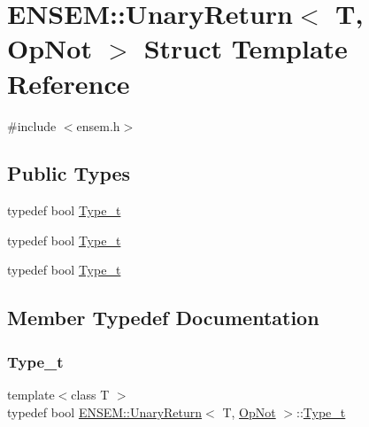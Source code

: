 \hypertarget{structENSEM_1_1UnaryReturn_3_01T_00_01OpNot_01_4}{}\section{E\+N\+S\+EM\+:\+:Unary\+Return$<$ T, Op\+Not $>$ Struct Template Reference}
\label{structENSEM_1_1UnaryReturn_3_01T_00_01OpNot_01_4}


{\ttfamily \#include $<$ensem.\+h$>$}

\subsection*{Public Types}
\begin{DoxyCompactItemize}
\item 
typedef bool \mbox{\hyperlink{structENSEM_1_1UnaryReturn_3_01T_00_01OpNot_01_4_ac8f0fccccf6b1d70cd924f95199cf9b4}{Type\+\_\+t}}
\item 
typedef bool \mbox{\hyperlink{structENSEM_1_1UnaryReturn_3_01T_00_01OpNot_01_4_ac8f0fccccf6b1d70cd924f95199cf9b4}{Type\+\_\+t}}
\item 
typedef bool \mbox{\hyperlink{structENSEM_1_1UnaryReturn_3_01T_00_01OpNot_01_4_ac8f0fccccf6b1d70cd924f95199cf9b4}{Type\+\_\+t}}
\end{DoxyCompactItemize}


\subsection{Member Typedef Documentation}
\mbox{\label{structENSEM_1_1UnaryReturn_3_01T_00_01OpNot_01_4_ac8f0fccccf6b1d70cd924f95199cf9b4}} 
\subsubsection{\texorpdfstring{Type\_t}{Type\_t}\hspace{0.1cm}{\footnotesize\ttfamily [1/3]}}
{\footnotesize\ttfamily template$<$class T $>$ \\
typedef bool \mbox{\hyperlink{structENSEM_1_1UnaryReturn}{E\+N\+S\+E\+M\+::\+Unary\+Return}}$<$ T, \mbox{\hyperlink{structENSEM_1_1OpNot}{Op\+Not}} $>$\+::\mbox{\hyperlink{structENSEM_1_1UnaryReturn_3_01T_00_01OpNot_01_4_ac8f0fccccf6b1d70cd924f95199cf9b4}{Type\+\_\+t}}}

